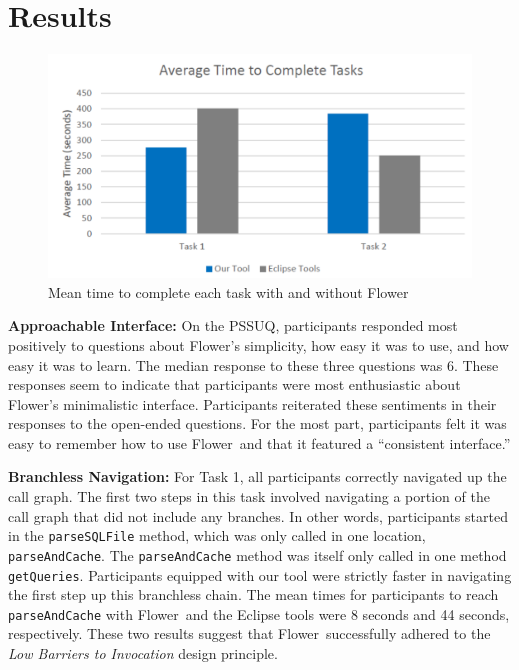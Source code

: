 \documentclass[conference]{IEEEtran}
\newcommand{\toolName}{Flower}
\begin{document}
\section{Results}
\begin{figure}
	\centering
	\includegraphics[width=\columnwidth]{images/taskTime}
	\caption{Mean time to complete each task with and without \toolName}
	\label{fig:taskTime} 
\end{figure}

\textbf{Approachable Interface:}
On the PSSUQ, participants responded most positively to questions about \toolName's simplicity, how easy it was to use, and how easy it was to learn. 
The median response to these three questions was 6.
These responses seem to indicate that participants were most enthusiastic about \toolName's minimalistic interface. 
Participants reiterated these sentiments in their responses to the open-ended questions. 
For the most part, participants felt it was easy to remember how to use \toolName~and that it featured a ``consistent interface.''

\textbf{Branchless Navigation:}
For Task 1, all participants correctly navigated up the call graph.
The first two steps in this task involved navigating a portion of the call graph that did not include any branches.
In other words, participants started in the \texttt{parseSQLFile} method, which was only called in one location, \texttt{parseAndCache}. 
The \texttt{parseAndCache} method was itself only called in one method \texttt{getQueries}.
Participants equipped with our tool were strictly faster in navigating the first step up this branchless chain. 
The mean times for participants to reach \texttt{parseAndCache} with \toolName~and the Eclipse tools were 8 seconds and 44 seconds, respectively.
These two results suggest that \toolName~successfully adhered to the \textit{Low Barriers to Invocation} design principle. 
\end{document}
